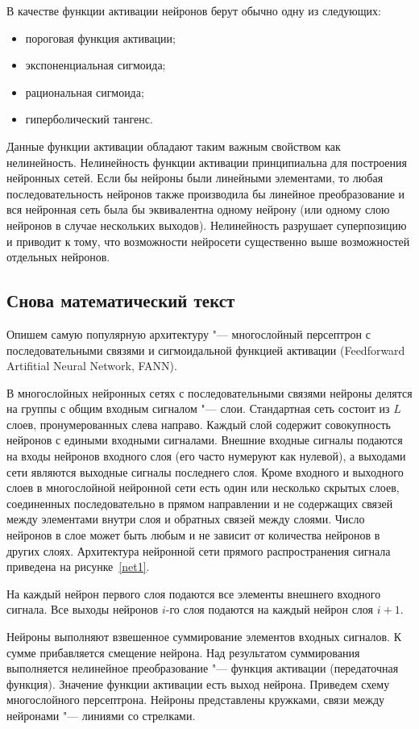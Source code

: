 \documentclass[bachelor, och, coursework, times]{SCWorks}
\begin{document}
В качестве функции активации нейронов берут обычно одну из
следующих:
\begin{itemize}
	\item пороговая функция активации;
	\item экспоненциальная сигмоида;
	\item рациональная сигмоида;
	\item гиперболический тангенс.
\end{itemize}

Данные функции активации обладают таким важным свойством как
нелинейность. Нелинейность функции активации принципиальна для
построения нейронных сетей. Если бы нейроны были линейными
элементами, то любая последовательность нейронов также производила
бы линейное преобразование и вся нейронная сеть была бы
эквивалентна одному нейрону (или одному слою нейронов в случае
нескольких выходов). Нелинейность разрушает суперпозицию и
приводит к тому, что возможности нейросети существенно выше
возможностей отдельных нейронов.

\subsection{Снова математический текст}
Опишем самую популярную архитектуру
"--- многослойный персептрон с последовательными связями и
сигмоидальной функцией активации (\foreignlanguage{english}{Feedforward Artifitial Neural
Network, FANN}).

В многослойных нейронных сетях с последовательными связями нейроны
делятся на группы с общим входным сигналом "--- слои. Стандартная
сеть состоит из $L$ слоев, пронумерованных слева направо. Каждый
слой содержит совокупность нейронов с едиными входными сигналами.
Внешние входные сигналы подаются на входы нейронов входного слоя
(его часто нумеруют как нулевой), а выходами сети являются
выходные сигналы последнего слоя. Кроме входного и выходного слоев
в многослойной нейронной сети есть один или несколько скрытых
слоев, соединенных последовательно в прямом направлении и не
содержащих связей между элементами внутри слоя и обратных связей
между слоями. Число нейронов в слое может быть любым и не зависит
от количества нейронов в других слоях. Архитектура нейронной сети
прямого распространения сигнала приведена на рисунке~\ref{net1}.

На каждый нейрон первого слоя подаются все элементы внешнего
входного сигнала. Все выходы нейронов $i$-го слоя подаются на
каждый нейрон слоя $i+1$.

Нейроны выполняют взвешенное суммирование элементов входных
сигналов. К сумме прибавляется смещение нейрона. Над результатом
суммирования выполняется нелинейное преобразование "--- функция
активации (передаточная функция). Значение функции активации есть
выход нейрона. Приведем схему многослойного персептрона. Нейроны
представлены кружками, связи между нейронами "--- линиями со
стрелками.
\end{document}

